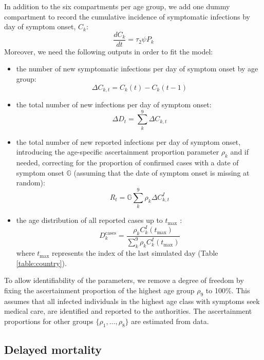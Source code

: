 \documentclass{article}
\begin{document}
	In addition to the six compartments per age group, we add one dummy compartment to record the cumulative incidence of symptomatic infections by day of symptom onset, $C_k$:
	\begin{equation}
	\frac{dC_k}{dt} = \tau_2 \psi P_k
	\end{equation}
	Moreover, we need the following outputs in order to fit the model:
	\begin{itemize}
	\item the number of new symptomatic infections per day of symptom onset by age group:
	\begin{equation}
	\Delta C_{k,t} =  C_k(t) - C_k(t-1) 
	\end{equation}
	\item the total number of new infections per day of symptom onset:
	\begin{equation}
	\Delta	D_t = \sum_k^9 \Delta C_{k,t}
	\end{equation}	

	\item the total number of new reported infections per day of symptom onset, introducing the age-specific ascertainment proportion parameter $\rho_k$ and if needed, correcting for the proportion of confirmed cases with a date of symptom onset $\mathds{G}$ (assuming that the date of symptom onset is missing at random):
	\begin{equation}
		R_t = \mathds{G}\sum_k^9 \rho_k \Delta C_{k,t}^{I}
		\label{eq:g}
	\end{equation}
	\item the age distribution of all reported cases up to $t_{\text{max}}$ :
	\begin{equation}
		D_k^{\text{cases}} =  \frac{\rho_k C^I_k(t_{\text{max}})}{\sum_k^9 \rho_k C^I_k(t_{\text{max}})}
	\end{equation}
	where $t_{\text{max}}$ represents the index of the last simulated day (Table \ref{table:country}).
	\end{itemize}

To allow identifiability of the parameters, we remove a degree of freedom by fixing the ascertainment proportion of the highest age group $\rho_9$ to 100\%. 
This assumes that all infected individuals in the highest age class with symptoms seek medical care, are identified and reported to the authorities. 
The ascertainment proportions for other groups $\{\rho_1,\ldots,\rho_8\}$ are estimated from data.

\subsection{Delayed mortality}
\end{document}
